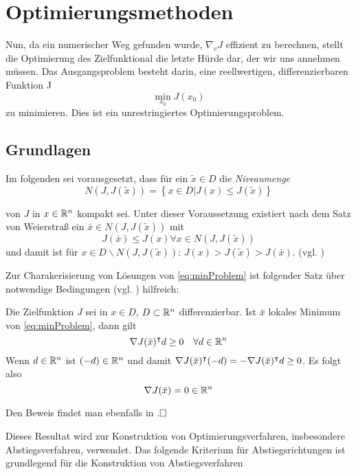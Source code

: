 \section{Optimierungsmethoden}

Nun, da ein numerischer Weg gefunden wurde, $\nabla_v J$ effizient zu berechnen, stellt die Optimierung des Zielfunktional die letzte Hürde dar, der wir uns annehmen müssen. Das Ausgangsproblem besteht darin, eine reellwertigen, differenzierbaren Funktion J
\begin{equation}
\label{eq:minProblem}
 \min_{x_0} J(x_0) 
\end{equation}
zu minimieren. Dies ist ein unrestringiertes Optimierungsproblem. 

\subsection{Grundlagen}
Im folgenden sei vorausgesetzt, dass für ein $\tilde x\in D$ die \textit{Niveaumenge}
 \begin{equation}
 \label{eq:niveauset}
  N(J,J(\tilde x)) = \left\{ x\in D \vert J(x)\leq J(\tilde x)\right\}
 \end{equation}

  

 von $J$ in $x\in \mathbb{R}^n$ kompakt sei. Unter dieser Voraussetzung existiert nach dem Satz von Weierstraß ein $\bar x \in N(J,J(\tilde x))$ mit 
 \[
  J(\bar x) \leq J(x) \forall x\in N(J,J(\tilde x))
 \]
 und damit ist für $x\in D\backslash N(J,J(\tilde x))$: $J(x)>J(\tilde x)> J(\bar x)$. (vgl. \cite[Satz 1.2.2]{alt2002nichtlineare})
 

Zur Charakerisierung von Lösungen von \eqref{eq:minProblem} ist folgender Satz über notwendige Bedingungen (vgl. \cite[vgl. Satz 3.1.1 ff.]{alt2002nichtlineare}) hilfreich:
\begin{theorem} 
\label{thm:optnotbed}
 Die Zielfunktion $J$ sei in $x\in D$, $D\subset \mathbb{R}^n$ differenzierbar. Ist $\bar x$ lokales Minimum von \eqref{eq:minProblem}, dann gilt
 \[
  \nabla J(\bar x)^\intercal d \geq 0 \quad \forall d\in \mathbb{R}^n
 \]
 Wenn $d\in \mathbb{R}^n$ ist $(-d)\in \mathbb{R}^n$ und damit $\nabla J(\bar x)^\intercal (-d) =  - \nabla J(\bar x)^\intercal d  \geq 0$. Es folgt also
 \[
  \nabla J(\bar x)  =0 \in \mathbb{R}^n
 \]
\end{theorem}
 Den Beweis findet man ebenfalls in \cite[vgl. Satz 3.1.1 ff]{alt2002nichtlineare}.$\proofend$

Dieses Resultat wird zur Konstruktion von Optimierungsverfahren, insbesondere Abstiegsverfahren, verwendet. Das folgende Kriterium für Abstiegsrichtungen ist grundlegend für die Konstruktion von Abstiegsverfahren

